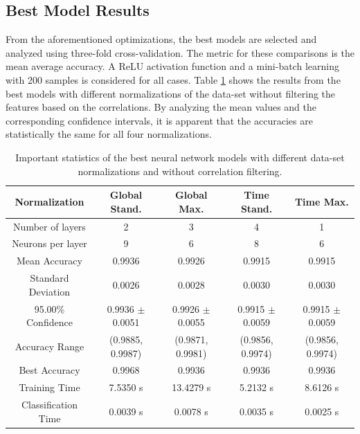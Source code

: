 \documentclass[paper=a4, fontsize=11pt]{scrartcl} %
\begin{document}
\subsection*{Best Model Results}

From the aforementioned optimizations, the best models are selected and analyzed using three-fold cross-validation.
The metric for these comparisons is the mean average accuracy.
A ReLU activation function and a mini-batch learning with 200 samples is considered for all cases.
Table \ref{tab:best_nn_models_unfiltered} shows the results from the best models with different normalizations of the data-set without filtering the features based on the correlations.
By analyzing the mean values and the corresponding confidence intervals, it is apparent that the accuracies are statistically the same for all four normalizations.
\begin{table}[H]
	\small
	\centering
	\caption{Important statistics of the best neural network models with different data-set normalizations and without correlation filtering.}
	\label{tab:best_nn_models_unfiltered}
	\begin{tabular}{|c|c|c|c|c|}
		\hline
		\textbf{Normalization}         & \textbf{Global Stand.}        & \textbf{Global Max.}            & \textbf{Time Stand.}            & \textbf{Time Max.} \\ \hline \hline
		Number of layers     & 2                    & 3                      & 4                     & 1 \\ \hline
		Neurons per layer    & 9                    & 6                      & 8                     & 6 \\ \hline
		Mean Accuracy        & 0.9936               & 0.9926                 & 0.9915                & 0.9915 \\ \hline
		Standard Deviation   & 0.0026               & 0.0028                 & 0.0030                & 0.0030 \\ \hline
		95.00\% Confidence   & 0.9936 $\pm$ 0.0051  & 0.9926 $\pm$ 0.0055    & 0.9915 $\pm$ 0.0059   & 0.9915 $\pm$ 0.0059 \\ \hline
		Accuracy Range       & (0.9885, 0.9987)     & (0.9871, 0.9981)       & (0.9856, 0.9974)      & (0.9856, 0.9974) \\ \hline
		Best Accuracy        & 0.9968               & 0.9936                 & 0.9936                & 0.9936 \\ \hline
		Training Time        & 7.5350 s             & 13.4279 s              & 5.2132 s              & 8.6126 s \\ \hline
		Classification Time  & 0.0039 s             & 0.0078 s               & 0.0035 s              & 0.0025 s  \\ \hline
	\end{tabular}
\end{table}
\end{document}
